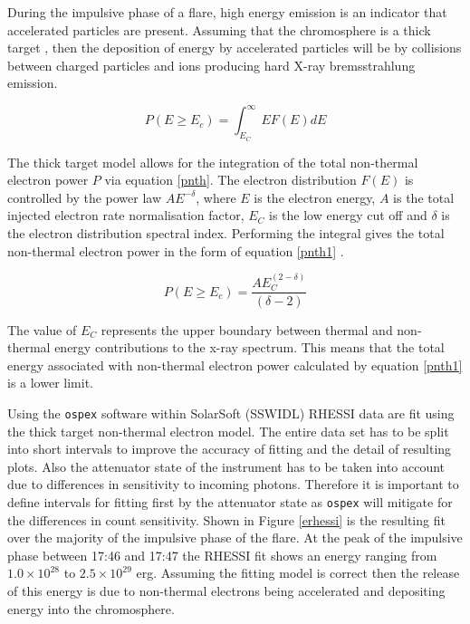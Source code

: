 During the impulsive phase of a flare, high energy emission is an indicator that accelerated particles are present. Assuming that the chromosphere is a thick target \citep{1971SoPh...18..489B}, then the deposition of energy by accelerated particles will be by collisions between charged particles and ions producing hard X-ray bremsstrahlung emission.
 
\begin{equation}\label{pnth}
P(E \geq E_{c}) = \int_{E_{C}}^{\infty} EF(E)dE
\end{equation}

The thick target model allows for the integration of the total non-thermal electron power $P$ via equation \ref{pnth}. The electron distribution $F(E)$ is controlled by the power law $AE^{-\delta}$, where $E$ is the electron energy, $A$ is the total injected electron rate normalisation factor, $E_{C}$ is the low energy cut off and $\delta$ is the electron distribution spectral index.   
Performing the integral gives the total non-thermal electron power in the form of equation \ref{pnth1} .

\begin{equation}\label{pnth1}
P(E \geq E_{c}) = \frac{AE_{C}^{(2-\delta)}}{(\delta - 2)}
\end{equation}

The value of $E_{C}$ represents the upper boundary between thermal and non-thermal energy contributions to the x-ray spectrum. This means that the total energy associated with non-thermal electron power calculated by equation \ref{pnth1} is a lower limit.
  
Using the \texttt{ospex} software within SolarSoft (SSWIDL) RHESSI data are fit using the thick target non-thermal electron model. The entire data set has to be split into short intervals to improve the accuracy of fitting and the detail of resulting plots. Also the attenuator state of the instrument has to be taken into account due to differences in sensitivity to incoming photons. Therefore it is important to define intervals for fitting first by the attenuator state as \texttt{ospex} will mitigate for the differences in count sensitivity. Shown in Figure \ref{erhessi} is the resulting fit over the majority of the impulsive phase of the flare. At the peak of the impulsive phase between 17:46 and 17:47 the RHESSI fit shows an energy ranging from $1.0{\times}10^{28}$ to $2.5{\times}10^{29}$ erg. Assuming the fitting model is correct then the release of this energy is due to non-thermal electrons being accelerated and depositing energy into the chromosphere. 


